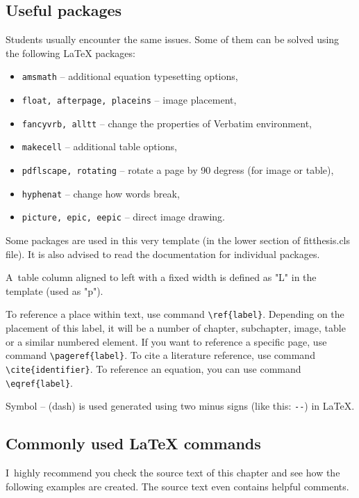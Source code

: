 \subsection*{Useful packages}

Students usually encounter the same issues. Some of them can be solved using the following \LaTeX{} packages:

\begin{itemize}
  \item \verb|amsmath| -- additional equation typesetting options,
  \item \verb|float, afterpage, placeins| -- image placement,
  \item \verb|fancyvrb, alltt| -- change the properties of Verbatim environment, 
  \item \verb|makecell| -- additional table options,
  \item \verb|pdflscape, rotating| -- rotate a page by 90 degress (for image or table),
  \item \verb|hyphenat| -- change how words break,
  \item \verb|picture, epic, eepic| -- direct image drawing.
\end{itemize}

Some packages are used in this very template (in the lower section of fitthesis.cls file). It is also advised to read the documentation for individual packages.

A~table column aligned to left with a fixed width is defined as "L" in the template (used as "p").

To reference a place within text, use command \verb|\ref{label}|. Depending on the placement of this label, it will be a number of chapter, subchapter, image, table or a similar numbered element. If you want to reference a specific page, use command \verb|\pageref{label}|. To cite a literature reference, use command \verb|\cite{identifier}|. To reference an equation, you can use command \verb|\eqref{label}|.

Symbol -- (dash) is used generated using two minus signs (like this: \verb|--|) in \LaTeX.

\subsection*{Commonly used \LaTeX{} commands}
\label{sec:Fragments}

I~highly recommend you check the source text of this chapter and see how the following examples are created. The source text even contains helpful comments.

